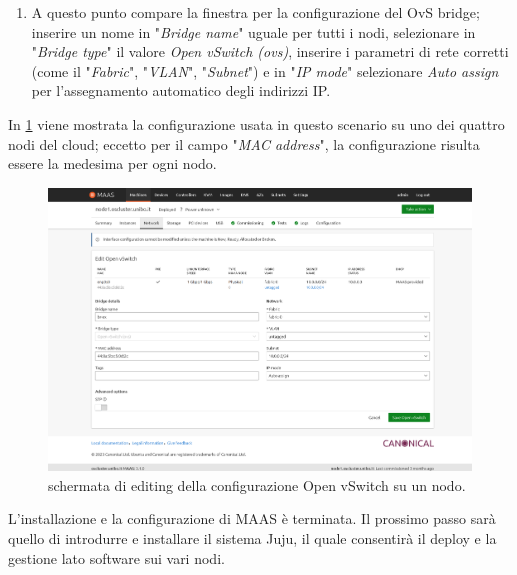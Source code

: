 \begin{enumerate}
\begin{enumerate}
        \item A questo punto compare la finestra per la configurazione del OvS bridge; inserire un nome in "\emph{Bridge name}" uguale per tutti i nodi, selezionare in "\emph{Bridge type}" il valore \emph{Open vSwitch (ovs)}, inserire i parametri di rete corretti (come il  "\emph{Fabric}",  "\emph{VLAN}", "\emph{Subnet}") e in "\emph{IP mode}" selezionare \emph{Auto assign} per l'assegnamento automatico degli indirizzi IP.
    \end{enumerate}

    In \cref{fig:maas_ovs} viene mostrata la configurazione usata in questo scenario su uno dei quattro nodi del cloud;
    eccetto per il campo "\emph{MAC address}", la configurazione risulta essere la medesima per ogni nodo.
\end{enumerate}

\begin{figure}[H]
    \centering
    \includegraphics[width=1\linewidth]{tesi/files/immagini/maas/ovs}
    \caption{schermata di editing della configurazione Open vSwitch su un nodo.}
    \label{fig:maas_ovs}
\end{figure}


\bigskip\bigskip\noindent
L'installazione e la configurazione di MAAS è terminata.
% 
Il prossimo passo sarà quello di introdurre e installare il sistema Juju, il quale consentirà il deploy e la gestione lato software sui vari nodi. 

% 
